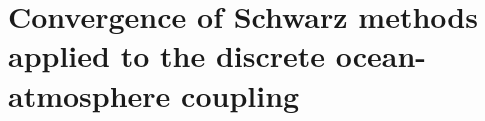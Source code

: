 \chapter{Convergence of Schwarz methods applied to the
discrete ocean-atmosphere coupling}
\label{ch:OASchwarz}
\minitoc

\begin{subappendices}


\end{subappendices}
